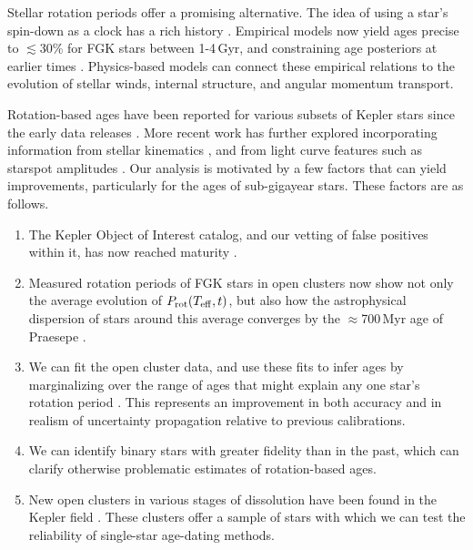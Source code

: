 \documentclass[11pt,twocolumn,tighten]{aastex63}
\begin{document}
Stellar rotation periods offer a promising alternative.  The idea of
using a star's spin-down as a clock has a rich history
\citep{Skumanich_1972,Noyes_1984,Kawaler_1989,Barnes03,Mamajek_2008,Angus_2015}.
Empirical models now yield ages precise to $\lesssim$30\% for FGK stars
between 1-4\,Gyr, and constraining age posteriors at earlier times
\citep{Bouma_2023}.  Physics-based models
\citep{Matt_2015,Gallet_Bouvier_2015,Spada_2020} can 
connect these empirical relations to the evolution of stellar winds,
internal structure, and angular momentum transport.

Rotation-based ages have been reported for
various subsets of Kepler stars since the early data releases
\citep[e.g.][]{Walkowicz_2013,McQuillan_2014,Reinhold_2015,Angus_2018}.
More recent work has further explored incorporating information from
stellar kinematics \citep{2021AJ....161..189L,2024AJ....167..159L},
and from light curve features such as starspot amplitudes
\citep{2023ApJ...952..131M}.  Our analysis is motivated by a few
factors that can yield improvements, particularly for the ages of
sub-gigayear stars.   These factors are as follows.

\begin{enumerate}[label={\it \roman*)},leftmargin=12pt,topsep=0pt,itemsep=-1ex,partopsep=1ex,parsep=1ex]
  \item The Kepler Object of Interest catalog, and our vetting of
    false positives within it, has now reached maturity
    \citep[e.g.][]{Thompson_2018}.
  \item Measured rotation periods of FGK stars in open clusters now
    show not only the average evolution of $P_{\rm rot}(T_{\rm eff},t)$,
    but also how the astrophysical dispersion of stars around this average
    converges by the $\approx$700\,Myr age of Praesepe
    \citep[e.g.][]{Curtis_2019_ngc6811,Gillen_2020,Rampalli_2021,Fritzewski_2021,Rebull_2022,Dungee_2022,2023AJ....166...14B}.
  \item We can fit the open cluster data, and use these fits to infer
    ages by marginalizing over the range of ages that might explain
    any one star's rotation period \citep{Bouma_2023}.
    This represents an improvement in both accuracy and in realism
    of uncertainty propagation relative to previous calibrations.
  \item We can identify binary stars with greater fidelity than
    in the past, which can clarify otherwise problematic estimates of
    rotation-based ages.
  \item New open clusters in various stages of dissolution have been
    found in the Kepler field
    \cite[e.g.][]{2019AJ....158..122K,Bouma_2022b,Barber_2022}.
    These clusters offer a sample of stars with which we can test the
    reliability of single-star age-dating methods.
\end{enumerate}
\end{document}

